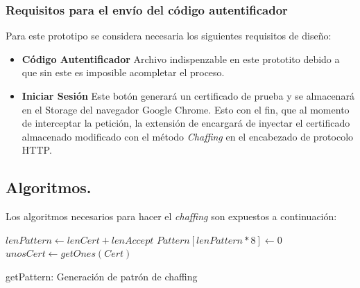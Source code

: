 \documentclass[12pt, a4paper, titlepage]{report}
\begin{document}
    			     \subsubsection{Requisitos para el envío del código autentificador}   
    			        Para este prototipo se considera necesaria los siguientes requisitos de diseño:
    			        \begin{itemize}
    			            \item \textbf{Código Autentificador} Archivo indispenzable en este prototito debido a que sin este es imposible acompletar el proceso.
                            
    			            \item \textbf{Iniciar Sesión} Este botón generará un certificado de prueba y se almacenará en el Storage del navegador Google Chrome. Esto con el fin, que al momento de interceptar la petición, la extensión de encargará de inyectar el certificado almacenado modificado con el método \textit{Chaffing} en el encabezado de protocolo HTTP.
    			           
    			        \end{itemize}
    			        \newpage
    			        
    			        
    		\subsection{Algoritmos.}
		        Los algoritmos necesarios para hacer el \textit{chaffing} son expuestos a continuación:\\
                \begin{algorithm}[H] %
                    \SetAlgoLined
                    $lenPattern \longleftarrow lenCert + lenAccept$\;
                    $Pattern[lenPattern*8] \longleftarrow 0$\;
                    $unosCert \longleftarrow getOnes(Cert)$\;
                    \caption{getPattern: Generación de patrón de chaffing}
                \end{algorithm}
                
\end{document}
